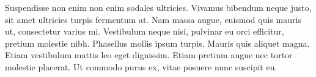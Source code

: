 \documentclass[a4paper,14pt]{extarticle}
\begin{document}
Suspendisse non enim non enim sodales ultricies. Vivamus bibendum neque justo, sit amet ultricies turpis fermentum at. Nam massa augue, euismod quis mauris ut, consectetur varius mi. Vestibulum neque nisi, pulvinar eu orci efficitur, pretium molestie nibh. Phasellus mollis ipsum turpis. Mauris quis aliquet magna. Etiam vestibulum mattis leo eget dignissim. Etiam pretium augue nec tortor molestie placerat. Ut commodo purus ex, vitae posuere nunc suscipit eu.
\end{document}
